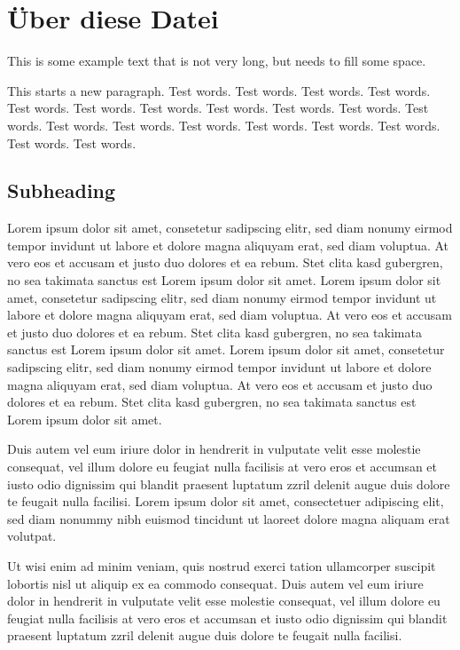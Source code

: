 \documentclass[
	ngerman,
	ruledheaders=section,%
	class=report,%
	thesis={type=bachelor},%
	accentcolor=9c,%
	custommargins=true,%
	marginpar=false,%
	parskip=half-,%
	fontsize=11pt,%
]{tudapub}
\begin{document}
\tableofcontents

\chapter{Über diese Datei}
This is some example text that is not very long, but needs to fill some space. \cite{tudapub}

This starts a new paragraph. Test words. Test words. Test words. Test words. Test words. Test words. Test words. Test words. Test words. Test words. Test words. Test words. Test words. Test words. Test words. Test words. Test words. Test words. Test words. 

\section{Subheading}
Lorem ipsum dolor sit amet, consetetur sadipscing elitr, sed diam nonumy eirmod tempor invidunt ut labore et dolore magna aliquyam erat, sed diam voluptua. At vero eos et accusam et justo duo dolores et ea rebum. Stet clita kasd gubergren, no sea takimata sanctus est Lorem ipsum dolor sit amet. Lorem ipsum dolor sit amet, consetetur sadipscing elitr, sed diam nonumy eirmod tempor invidunt ut labore et dolore magna aliquyam erat, sed diam voluptua. At vero eos et accusam et justo duo dolores et ea rebum. Stet clita kasd gubergren, no sea takimata sanctus est Lorem ipsum dolor sit amet. Lorem ipsum dolor sit amet, consetetur sadipscing elitr, sed diam nonumy eirmod tempor invidunt ut labore et dolore magna aliquyam erat, sed diam voluptua. At vero eos et accusam et justo duo dolores et ea rebum. Stet clita kasd gubergren, no sea takimata sanctus est Lorem ipsum dolor sit amet.   

Duis autem vel eum iriure dolor in hendrerit in vulputate velit esse molestie consequat, vel illum dolore eu feugiat nulla facilisis at vero eros et accumsan et iusto odio dignissim qui blandit praesent luptatum zzril delenit augue duis dolore te feugait nulla facilisi. Lorem ipsum dolor sit amet, consectetuer adipiscing elit, sed diam nonummy nibh euismod tincidunt ut laoreet dolore magna aliquam erat volutpat.   

Ut wisi enim ad minim veniam, quis nostrud exerci tation ullamcorper suscipit lobortis nisl ut aliquip ex ea commodo consequat. Duis autem vel eum iriure dolor in hendrerit in vulputate velit esse molestie consequat, vel illum dolore eu feugiat nulla facilisis at vero eros et accumsan et iusto odio dignissim qui blandit praesent luptatum zzril delenit augue duis dolore te feugait nulla facilisi.   
\end{document}
